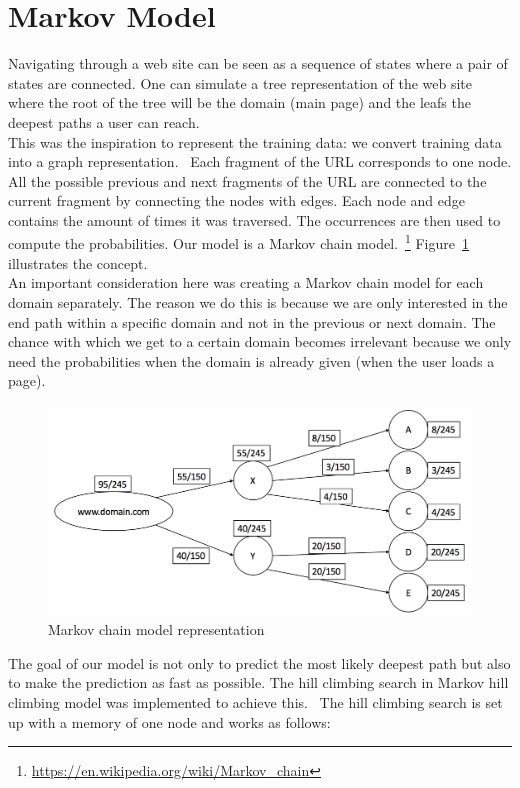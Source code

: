 \section{Markov Model}\label{sec:models}

Navigating through a web site can be seen as a sequence of states where a pair of states are connected. One can simulate a tree representation of the web site where the root of the tree will be the domain (main page) and the leafs the deepest paths a user can reach.
\\[2ex]
This was the inspiration to represent the training data: we convert training data into a graph representation.~\cite{article:markovmodel} Each fragment of the URL corresponds to one node. All the possible previous and next fragments of the URL are connected to the current fragment by connecting the nodes with edges. Each node and edge contains the amount of times it was traversed. The occurrences are then used to compute the probabilities. Our model is a Markov chain model.~\footnote{\url{https://en.wikipedia.org/wiki/Markov_chain}} Figure~\ref{fig:markov_chain} illustrates the concept.
\\[2ex]
An important consideration here was creating a Markov chain model for each domain separately. The reason we do this is because we are only interested in the end path within a specific domain and not in the previous or next domain. The chance with which we get to a certain domain becomes irrelevant because we only need the probabilities when the domain is already given (when the user loads a page).

\begin{figure}[!htp]
	\centering
	\includegraphics[width=\textwidth]{markov_chain}
	\caption{Markov chain model representation}\label{fig:markov_chain}
\end{figure}

The goal of our model is not only to predict the most likely deepest path but also to make the prediction as fast as possible. The hill climbing search in Markov hill climbing model was implemented to achieve this.~\cite{lopez2008heuristic} The hill climbing search is set up with a memory of one node and works as follows:

